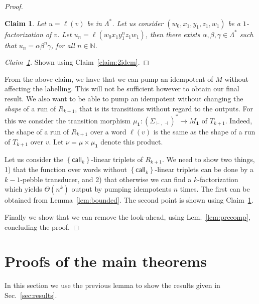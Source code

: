 \documentclass{article}
\newcommand{\set}[1]{\left\{#1 \right\}}
\newcommand{\nat}{\mathbb N}
\newcommand{\call}{\mathsf {call}}
\newtheorem{claim}[theorem]{Claim}
\theoremstyle{definition}
\theoremstyle{remark}
\begin{document}
\begin{proof}
    \begin{claim}\label{claim:pump}
        Let $u=\ell(v)$ be in $ \Lambda^*$.
        Let us consider $(w_0,x_1,y_1,z_1,w_1)$ be a $1$-factorization of $v$.
        Let $u_n=\ell(w_0x_1y_1^nz_1w_1)$, then there exists $\alpha,\beta,\gamma\in \Lambda^*$ such that $u_n=\alpha\beta^n\gamma$, for all $n\in \nat$.
    \end{claim}
\begin{proof}[Claim~\ref{claim:pump}]
    Shown using Claim~\ref{claim:2idem}.
\end{proof}
From the above claim, we have that we can pump an idempotent of $M$ without affecting the labelling.
This will not be sufficient however to obtain our final result. We also want to be able to pump an idempotent without changing the \emph{shape} of a run of $R_{k+1}$, that is its transitions without regard to the outputs.
For this we consider the transition morphism $\mu_{\mathbf 1}:(\Sigma_{\vdash,\dashv})^*\rightarrow M_{\mathbf 1}$ of $T_{k+1}$. Indeed, the shape of a run of $R_{k+1}$ over a word $\ell(v)$ is the same as the shape of a run of $T_{k+1}$ over $v$.
Let $\nu=\mu\times \mu_{\mathbf 1}$ denote this product.

Let us consider the $\set{\call_k}$-linear triplets of $R_{k+1}$.
We need to show two things, 1) that the function over words without $\set{\call_k}$-linear triplets can be done by a $k{-}1$-pebble transducer, and 2) that otherwise we can find a $k$-factorization which yields $\Theta(n^k)$ output by pumping idempotents $n$ times.
The first can be obtained from Lemma~\ref{lem:bounded}. The second point is shown using Claim~\ref{claim:pump}.

Finally we show that we can remove the look-ahead, using Lem.~\ref{lem:precomp}, concluding the proof.
\end{proof}

\section{Proofs of the main theorems}

In this section we use the previous lemma to show the results given in Sec.~\ref{sec:results}.
\onkthm*
\end{document}
